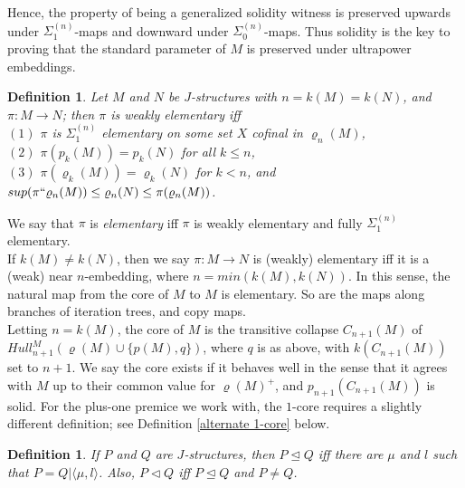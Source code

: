 \documentclass[12pt]{article}
\newtheorem{defn}[thm]{Definition}
\begin{document}
Hence, the property of being a generalized solidity witness is preserved upwards under $\Sigma_1^{(n)}$-maps and downward under $\Sigma_0^{(n)}$-maps.  Thus solidity is the key to proving that the standard parameter of $M$ is preserved under ultrapower embeddings.\\






\begin{defn} \label{elementary}
Let $M$ and $N$ be $J$-structures with $n = k(M) = k(N)$, and $\pi: M \longrightarrow N$; then $\pi$ is \textit{weakly elementary} iff\\

\indent $(1)$ $\pi$ is $\Sigma_1^{(n)}$ elementary on some set $X$ cofinal in $\varrho_n (M)$,\\

\indent $(2)$ $\pi ( p_k (M)) = p_k (N)$ for all $k \leq n$,\\

\indent $(3)$ $\pi ( \varrho_k (M)) = \varrho_k (N)$ for $k < n$, and $sup ( \pi `` \varrho_n (M)) \leq \varrho_n (N) \leq \pi (\varrho_n (M))$.\\

\end{defn}


We say that $\pi$ is \textit{elementary} iff $\pi$ is weakly elementary and fully $\Sigma_1^{(n)}$ elementary.\\

If $k(M) \neq k(N)$, then we say $\pi : M \longrightarrow N$ is (weakly) elementary iff it is a (weak) near $n$-embedding, where $n = min(k(M), k(N))$.  In this sense, the natural map from the core of $M$ to $M$ is elementary.  So are the maps along branches of iteration trees, and copy maps.\\

Letting $n = k(M)$, the core of $M$ is the transitive collapse $C_{n + 1} (M)$ of $Hull_{n+1}^M (\varrho (M) \cup \{ p (M) , q \} )$, where $q$ is as above, with $k (C_{n+1} (M))$ set to $n + 1$.  We say the core exists if it behaves well in the sense that it agrees with $M$ up to their common value for $\varrho (M)^+$, and $p_{n + 1} (C_{n+1} (M))$ is solid.  For the plus-one premice we work with, the $1$-core requires a slightly different definition; see Definition \ref{alternate 1-core} below.\\

\begin{defn} \label{initial segment}
If $P$ and $Q$ are $J$-structures, then $P \unlhd Q$ iff there are $\mu$ and $l$ such that $P = Q | \langle \mu , l \rangle$.  Also, $P \lhd Q$ iff $P \unlhd Q$ and $P \neq Q$.\\
\end{defn}
\end{document}
